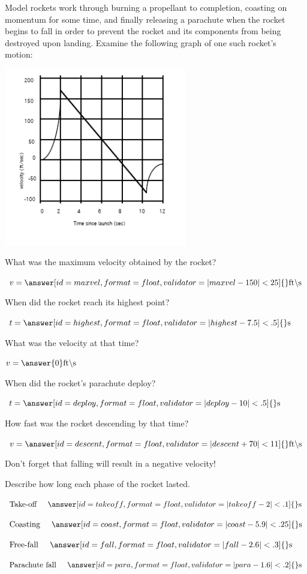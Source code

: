 \documentclass{ximera}
\begin{document}
\begin{question}
Model rockets work through burning a propellant to completion, coasting on momentum for some time, and finally releasing a parachute when the rocket begins to fall in order to prevent the rocket and its components from being destroyed upon landing. Examine the following graph of one such rocket's motion:
\begin{image}
    \includegraphics[width=80mm]{rocket.png}
\end{image}

What was the maximum velocity obtained by the rocket?

$v = \answer[id=maxvel,format=float,validator=|maxvel-150|<25]{} \text{ft}\backslash \text{s}$

When did the rocket reach its highest point?

$t = \answer[id=highest,format=float,validator=|highest-7.5|<.5]{} \text{s}$

What was the velocity at that time?

$v = \answer{0} \text{ft} \backslash \text{s}$

When did the rocket's parachute deploy?

$t = \answer[id=deploy,format=float,validator=|deploy-10|<.5]{} \text{s}$

How fast was the rocket descending by that time?

$v = \answer[id=descent,format=float,validator=|descent+70|<11]{} \text{ft} \backslash \text{s}$
\begin{feedback}[wrong]
Don't forget that falling will result in a negative velocity!
\end{feedback}

Describe how long each phase of the rocket lasted.

$\text{Take-off} \hspace{5mm} \answer[id=takeoff,format=float,validator=|takeoff-2|<.1]{} \text{s}$

$\text{Coasting} \hspace{5mm} \answer[id=coast,format=float,validator=|coast-5.9|<.25]{} \text{s}$

$\text{Free-fall} \hspace{5mm} \answer[id=fall,format=float,validator=|fall-2.6|<.3]{} \text{s}$

$\text{Parachute fall} \hspace{5mm} \answer[id=para,format=float,validator=|para-1.6|<.2]{} \text{s}$
\end{question}
\end{document}
